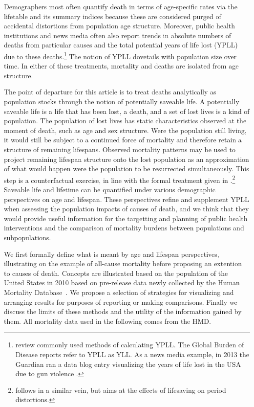 \documentclass{article}
\begin{document}
Demographers most often quantify death in terms of age-specific rates via the
lifetable and its summary indices because these are considered purged of
accidental distortions from population age structure. Moreover, public health
institutions and news media often also report trends in absolute numbers of
deaths from particular causes and the total potential years of life lost (YPLL) due to these deaths.\footnote{\citet{gardner1990} review commonly used methods of
calculating YPLL. The Global Burden of Disease reports refer to YPLL as YLL.
As a news media example, in 2013 the Guardian ran a data blog entry
visualizing the years of life lost in the USA due to gun violence
\citep{rogers2013gun}. } The notion of YPLL dovetails with
population size over time. In either of these treatments, mortality and deaths are
isolated from age structure. 

The point of departure for this article is to
treat deaths analytically as population stocks through the notion of
potentially saveable life. A potentially saveable life is a life that
has been lost, a death, and a set of lost lives is a kind of population. The
population of lost lives has static characteristics observed at the moment of
death, such as age and sex structure. Were the
population still living, it would still be subject to a continued force of
mortality and therefore retain a structure of remaining lifespans.
Observed mortality patterns may be used to project remaining lifespan structure onto the lost population as an approximation of what would
happen were the population to be resurrected simultaneously.
This step is a counterfactual exercise, in line with the formal treatment given
in \citet{vaupel1987repeated}.\footnote{\citet{vaupel2008lifesaving} follows in
a similar vein, but aims at the effects of lifesaving on period distortions.}
Saveable life and lifetime can be quantified under various demographic
perspectives on age and lifespan. These perspectives refine and supplement YPLL when assessing the population impacts of causes of death, and we think that they would provide useful information for the targetting and planning of public health interventions and the comparison of mortality burdens between populations and subpopulations. 

We first formally define what is meant by age and lifespan
perspectives, illustrating on the example of all-cause
mortality before proposing an extention to causes of death. Concepts are
illustrated based on the population of the United States in 2010 based on pre-release
data newly collected by the Human Mortality
Database~. We propose
a selection of strategies for visualizing and arranging results for purposes of
reporting or making comparisons. Finally we discuss the limits of these methods
and the utility of the information gained by them. All mortality data used in
the following comes from the HMD.
\end{document}
